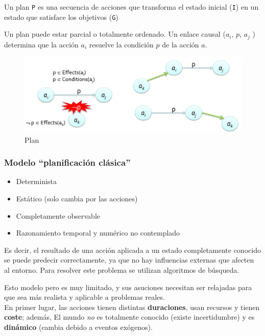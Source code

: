 \begin{paracol}{2}
   
   \colfill
   \begin{definition}[Plan]
      Un plan \lstinline|P| es una secuencia de acciones que transforma el estado
      inicial (\lstinline|I|) en un estado que satisface los objetivos (\lstinline|G|)
   \end{definition}
   Un plan puede estar parcial o totalmente ordenado.
   Un enlace causal ($a_i$, $p$, $a_j$ ) determina que la acción $a_i$ resuelve la condición $p$ de la acción $a$.
   \colfill
   

   \switchcolumn

   \begin{figure}[htbp]
      \centering
      \includegraphics[width=\columnwidth]{images/02/planordenado.png}
      \caption{Plan}
      \label{fig:02/planordenado}
   \end{figure}

\end{paracol}

\subsubsection{Modelo ``planificación clásica''}
\begin{itemize}
	\item Determinista
	\item Estático (solo cambia por las acciones)
	\item Completamente observable
	\item Razonamiento temporal y numérico no contemplado
\end{itemize}

Es decir, el resultado de una acción aplicada a un estado
completamente conocido se puede predecir correctamente,
ya que no hay influencias externas que afecten al entorno.
Para resolver este problema se utilizan algoritmos de búsqueda.

Esto modelo pero es muy limitado, y sus asuciones necesitan ser relajadas para que sea más realista y aplicable a problemas reales.\\
En primer lugar, las acciones tienen distintas \textbf{duraciones}, usan recursos y tienen \textbf{coste}; además, El mundo \textit{no} es totalmente conocido (existe incertidumbre) y es \textbf{dinámico} (cambia debido a eventos exógenos).



